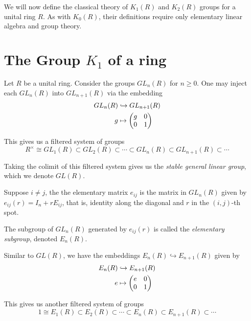 We will now define the classical theory of 
$K_1(R)$ and $K_2(R)$ groups for a unital ring $R$.
As with $K_0(R)$, their definitions require only elementary linear algebra and group theory.


\section{The Group $K_1$ of a ring}

Let $R$ be a unital ring. Consider the groups $GL_n(R)$ for $n \geq 0$.
One may inject each $GL_n(R)$ into $GL_{n+1}(R)$ via the embedding
\begin{align*}
  GL_n(R) &\hookrightarrow GL_{n+1}(R) \\
  g &\mapsto \begin{pmatrix} g & 0 \\ 0 & 1 \end{pmatrix}
\end{align*}

This gives us a filtered system of groups
\[
R^\times \cong GL_1(R) \subset GL_2(R)\subset \cdots \subset GL_n(R) \subset GL_{n+1}(R) \subset \cdots 
\]

\begin{definition}
Taking the colimit of this filtered system gives us the \emph{stable general linear group},
which we denote $GL(R)$.
\end{definition}

\begin{definition}
Suppose $i \neq j$, the the elementary matrix $e_{ij}$ is the matrix in $GL_n(R)$ given by  
$e_{ij}(r) = I_n + r E_{ij}$, that is, identity along the diagonal and $r$ in the $(i,j)$-th spot.

The subgroup of $GL_n(R)$ generated by $e_{ij}(r)$ is called the \emph{elementary subgroup},
denoted $E_n(R)$.
\end{definition}

Similar to $GL(R)$, we have the embeddings $E_n(R) \hookrightarrow E_{n+1}(R)$ given by
\begin{align*}
E_n(R) &\hookrightarrow E_{n+1}(R) \\
e &\mapsto \begin{pmatrix} e & 0 \\ 0 & 1 \end{pmatrix}
\end{align*}

This gives us another filtered system of groups
\[
1 \cong E_1(R) \subset E_2(R)\subset \cdots \subset E_n(R) \subset E_{n+1}(R) \subset \cdots 
\]


